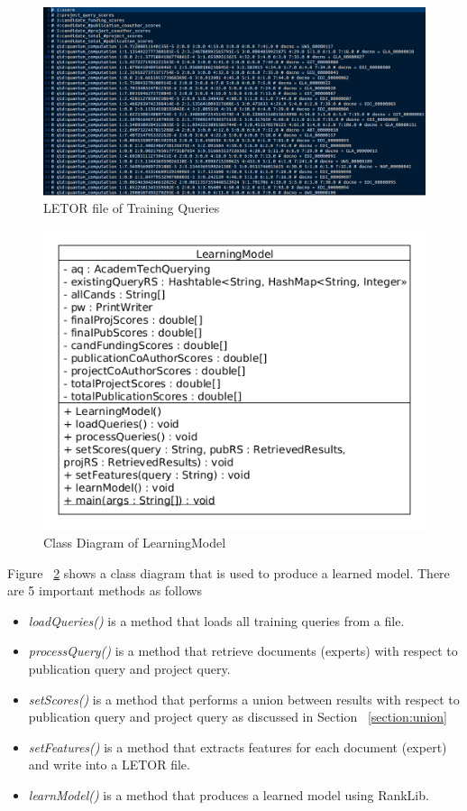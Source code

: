 \begin{figure}
\centering
\includegraphics[scale=0.3]{./figures/sampleletorfile.png}
\caption{LETOR file of Training Queries} \label{fig:sampleletorfile} 
\end{figure}

\begin{figure}
\centering
\includegraphics[scale=0.7]{./figures/learningModel.png}
\caption{Class Diagram of LearningModel} \label{fig:learningmodel} 
\end{figure}

Figure ~\ref{fig:learningmodel} shows a class diagram that is used to produce a learned model. There are 5 important methods as follows
\begin{itemize}
 \item \textit{loadQueries()} is a method that loads all training queries from a file.
 \item \textit{processQuery()} is a method that retrieve documents (experts) with respect to publication query and project query.
 \item \textit{setScores()} is a method that performs a union between results with respect to publication query and project query as discussed in Section ~\ref{section:union}
 \item \textit{setFeatures()} is a method that extracts features for each document (expert) and write into a LETOR file.
 \item \textit{learnModel()} is a method that produces a learned model using RankLib.
\end{itemize}

